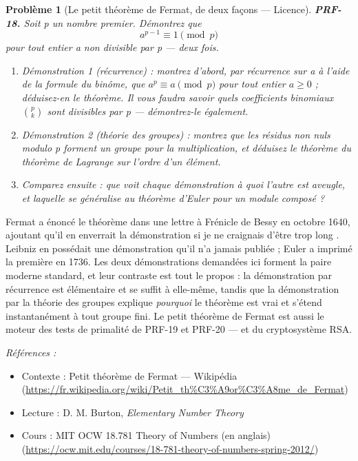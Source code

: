 \documentclass[11pt]{article}
\newtheorem{problem}{Problème}
\newenvironment{refs}{\par\small\noindent\emph{Références :}\begin{itemize}\setlength\itemsep{0pt}}{\end{itemize}\normalsize}
\begin{document}
\bigskip

\begin{problem}[{Le petit théorème de Fermat, de deux façons --- Licence}]
\textbf{PRF-18.} Soit p un nombre premier. Démontrez que
\[ a^{p-1} \equiv 1 \pmod{p} \]
pour tout entier a non divisible par p --- deux fois.
\begin{enumerate}
\item[(a)] Démonstration 1 (récurrence) : montrez d'abord, par récurrence sur a à l'aide de la
formule du binôme, que $ a^p \equiv a \pmod{p} $ pour tout entier $ a \ge 0 $ ;
déduisez-en le théorème. Il vous faudra savoir quels coefficients binomiaux
$ \binom{p}{k} $ sont divisibles par p --- démontrez-le également.
\item[(b)] Démonstration 2 (théorie des groupes) : montrez que les résidus non nuls modulo p
forment un groupe pour la multiplication, et déduisez le théorème du théorème de Lagrange
sur l'ordre d'un élément.
\item[(c)] Comparez ensuite : que voit chaque démonstration à quoi l'autre est aveugle, et
laquelle se généralise au théorème d'Euler pour un module composé ?
\end{enumerate}

\end{problem}

\noindent Fermat a énoncé le théorème dans une lettre à Frénicle de Bessy en octobre
1640, ajoutant qu'il en enverrait la démonstration \og{} si je ne craignais d'être trop long \fg{}.
Leibniz en possédait une démonstration qu'il n'a jamais publiée ; Euler a imprimé la première
en 1736. Les deux démonstrations demandées ici forment la paire moderne standard, et leur
contraste est tout le propos : la démonstration par récurrence est élémentaire et se suffit à
elle-même, tandis que la démonstration par la théorie des groupes explique \textit{pourquoi} le
théorème est vrai et s'étend instantanément à tout groupe fini. Le petit théorème de Fermat
est aussi le moteur des tests de primalité de PRF-19 et PRF-20 --- et du cryptosystème RSA.

\begin{refs}
\item Contexte : Petit théorème de Fermat --- Wikipédia (\url{https://fr.wikipedia.org/wiki/Petit_th%C3%A9or%C3%A8me_de_Fermat})
\item Lecture : D. M. Burton, \textit{Elementary Number Theory}
\item Cours : MIT OCW 18.781 Theory of Numbers (en anglais) (\url{https://ocw.mit.edu/courses/18-781-theory-of-numbers-spring-2012/})
\end{refs}
\end{document}
